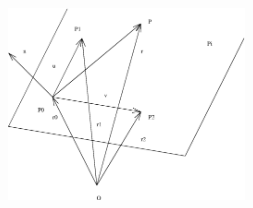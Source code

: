 \begin{frame}
\begin{columns}
  \column{5.5cm}
    \begin{figure}
        \includegraphics[height=2in]{../../modules/vectors/pictures/ok-plane_three_points.eps}
    \end{figure}
\end{columns}

\end{frame}


